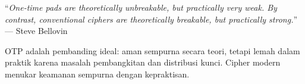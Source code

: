 \begin{konsep}
``\textit{One-time pads are theoretically unbreakable, but practically very weak. By contrast, conventional ciphers are theoretically breakable, but practically strong.}'' --- Steve Bellovin \cite{munir_slides_itb}

OTP adalah pembanding ideal: aman sempurna secara teori, tetapi lemah dalam praktik karena masalah pembangkitan dan distribusi kunci. Cipher modern menukar keamanan sempurna dengan kepraktisan.
\end{konsep}

